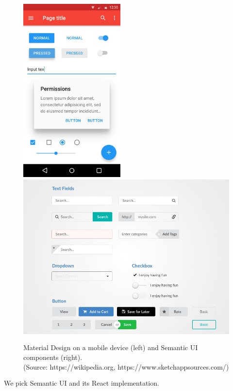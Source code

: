 \begin{figure}[!htb]
  \includegraphics[width=150pt]
    {images/materialdesign.png}
  \includegraphics[width=320pt]
    {images/semanticui.jpg}
  \caption{Material Design on a mobile device (left) and Semantic UI components (right). \\ (Source: https://wikipedia.org, https://www.sketchappsources.com/)}
\end{figure}

We pick Semantic UI and its React implementation.
